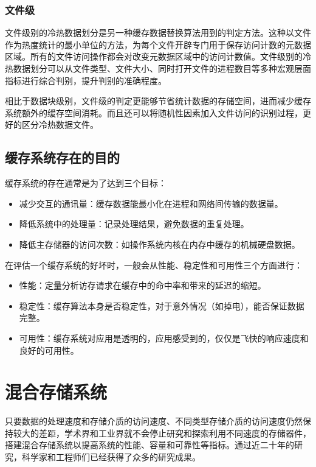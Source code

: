 \subsubsection{文件级}

文件级别的冷热数据划分\cite{linlin2011}是另一种缓存数据替换算法用到的判定方法。这种以文件作为热度统计的最小单位的方法，为每个文件开辟专门用于保存访问计数的元数据区域。所有的文件访问操作都会对改变元数据区域中的访问计数值。文件级别的冷热数据划分可以从文件类型、文件大小、同时打开文件的进程数目等多种宏观层面指标进行综合判别，提升判别的准确程度。

相比于数据块级别，文件级的判定更能够节省统计数据的存储空间，进而减少缓存系统额外的缓存空间消耗。而且还可以将随机性因素加入文件访问的识别过程，更好的区分冷热数据文件。

\subsection{缓存系统存在的目的}
缓存系统的存在通常是为了达到三个目标：
\begin{itemize}
\item 减少交互的通讯量：缓存数据能最小化在进程和网络间传输的数据量。
\item 降低系统中的处理量：记录处理结果，避免数据的重复处理。
\item 降低主存储器的访问次数：如操作系统内核在内存中缓存的机械硬盘数据。
\end{itemize}

在评估一个缓存系统的好坏时，一般会从性能、稳定性和可用性三个方面进行：
\begin{itemize}
\item 性能：定量分析访存请求在缓存中的命中率和带来的延迟的缩短。
\item 稳定性：缓存算法本身是否稳定性，对于意外情况（如掉电），能否保证数据完整。
\item 可用性：缓存系统对应用是透明的，应用感受到的，仅仅是飞快的响应速度和良好的可用性。
\end{itemize}

\section{混合存储系统}
\label{sec:hybrid_storage}

只要数据的处理速度和存储介质的访问速度、不同类型存储介质的访问速度仍然保持较大的差距，学术界和工业界就不会停止研究和探索利用不同速度的存储器件，搭建混合存储系统\cite{zhuqing2013hybrid}以提高系统的性能、容量和可靠性等指标。通过近二十年的研究，科学家和工程师们已经获得了众多的研究成果。

